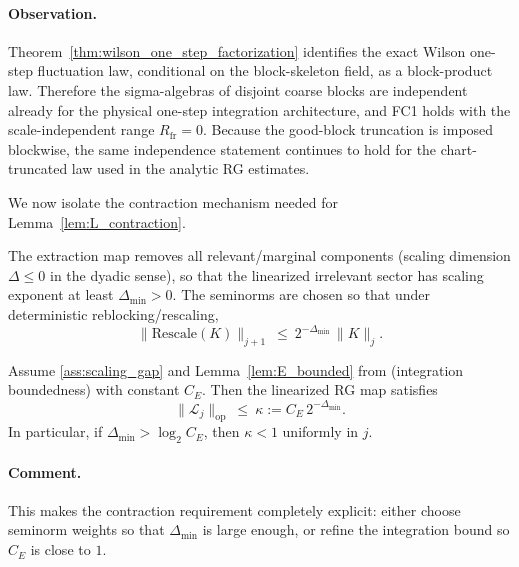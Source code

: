 \paragraph{Observation.}
Theorem~\ref{thm:wilson_one_step_factorization} identifies the exact Wilson one-step fluctuation law, conditional on the block-skeleton field, as a block-product law. Therefore the sigma-algebras of disjoint coarse blocks are independent already for the physical one-step integration architecture, and FC1 holds with the scale-independent range $R_{\mathrm{fr}}=0$. Because the good-block truncation is imposed blockwise, the same independence statement continues to hold for the chart-truncated law used in the analytic RG estimates.

We now isolate the contraction mechanism needed for Lemma~\ref{lem:L_contraction}.

\begin{proposition}\label{ass:scaling_gap}
The extraction map removes all relevant/marginal components (scaling dimension $\Delta\le 0$ in the dyadic sense),
so that the linearized irrelevant sector has scaling exponent at least $\Delta_{\min}>0$.
The seminorms are chosen so that under deterministic reblocking/rescaling,
\[
\|\mathrm{Rescale}(K)\|_{j+1}\ \le\ 2^{-\Delta_{\min}}\,\|K\|_j.
\]
\end{proposition}

\begin{lemma}\label{lem:kappa}
Assume \ref{ass:scaling_gap} and Lemma~\ref{lem:E_bounded} from (integration boundedness) with constant $C_E$.
Then the linearized RG map satisfies
\[
\|\mathcal L_j\|_{\mathrm{op}}\ \le\ \kappa:=C_E\,2^{-\Delta_{\min}}.
\]
In particular, if $\Delta_{\min}>\log_2 C_E$, then $\kappa<1$ uniformly in $j$.
\end{lemma}

\paragraph{Comment.}
This makes the contraction requirement completely explicit:
either choose seminorm weights so that $\Delta_{\min}$ is large enough,
or refine the integration bound so $C_E$ is close to $1$.

